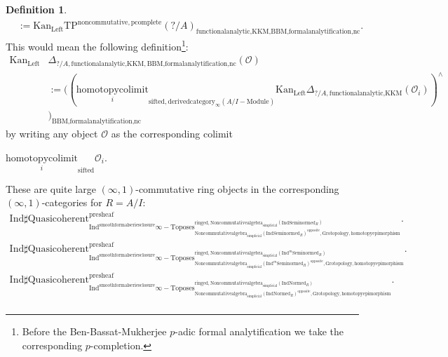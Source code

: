 \documentclass[11pt]{book}
\theoremstyle{definition}
\newtheorem{definition}[theorem]{Definition}
\numberwithin{equation}{section}
\begin{document}
\begin{definition}
\begin{align}
&:=\mathrm{Kan}_{\mathrm{Left}}\mathrm{TP}^\mathrm{noncommutative,pcomplete}(?/A)_{\text{functionalanalytic,KKM},\text{BBM,formalanalytification,nc}}.	
\end{align}
This would mean the following definition{\footnote{Before the Ben-Bassat-Mukherjee $p$-adic formal analytification we take the corresponding $p$-completion.}}:
\begin{align}
\mathrm{Kan}_{\mathrm{Left}}&\Delta_{?/A,\text{functionalanalytic,KKM},\text{BBM,formalanalytification,nc}}(\mathcal{O})\\
&:=	((\underset{i}{\text{homotopycolimit}}_{\text{sifted},\text{derivedcategory}_{\infty}(A/I-\text{Module})}\mathrm{Kan}_{\mathrm{Left}}\Delta_{?/A,\text{functionalanalytic,KKM}}(\mathcal{O}_i))^\wedge\\
&)_\text{BBM,formalanalytification,nc}
\end{align}
by writing any object $\mathcal{O}$ as the corresponding colimit 
\begin{center}
$\underset{i}{\text{homotopycolimit}}_\text{sifted}\mathcal{O}_i$.
\end{center}
These are quite large $(\infty,1)$-commutative ring objects in the corresponding $(\infty,1)$-categories for $R=A/I$:
\begin{align}
\mathrm{Ind}\mathrm{\sharp Quasicoherent}^{\text{presheaf}}_{\mathrm{Ind}^\text{smoothformalseriesclosure}\infty-\mathrm{Toposes}^{\mathrm{ringed},\mathrm{Noncommutativealgebra}_{\mathrm{simplicial}}(\mathrm{Ind}\mathrm{Seminormed}_R)}_{\mathrm{Noncommutativealgebra}_{\mathrm{simplicial}}(\mathrm{Ind}\mathrm{Seminormed}_R)^\mathrm{opposite},\mathrm{Grotopology,homotopyepimorphism}}}. \\
\mathrm{Ind}\mathrm{\sharp Quasicoherent}^{\text{presheaf}}_{\mathrm{Ind}^\text{smoothformalseriesclosure}\infty-\mathrm{Toposes}^{\mathrm{ringed},\mathrm{Noncommutativealgebra}_{\mathrm{simplicial}}(\mathrm{Ind}^m\mathrm{Seminormed}_R)}_{\mathrm{Noncommutativealgebra}_{\mathrm{simplicial}}(\mathrm{Ind}^m\mathrm{Seminormed}_R)^\mathrm{opposite},\mathrm{Grotopology,homotopyepimorphism}}}.\\
\mathrm{Ind}\mathrm{\sharp Quasicoherent}^{\text{presheaf}}_{\mathrm{Ind}^\text{smoothformalseriesclosure}\infty-\mathrm{Toposes}^{\mathrm{ringed},\mathrm{Noncommutativealgebra}_{\mathrm{simplicial}}(\mathrm{Ind}\mathrm{Normed}_R)}_{\mathrm{Noncommutativealgebra}_{\mathrm{simplicial}}(\mathrm{Ind}\mathrm{Normed}_R)^\mathrm{opposite},\mathrm{Grotopology,homotopyepimorphism}}}.\\

\end{align}
\end{definition}
\end{document}
